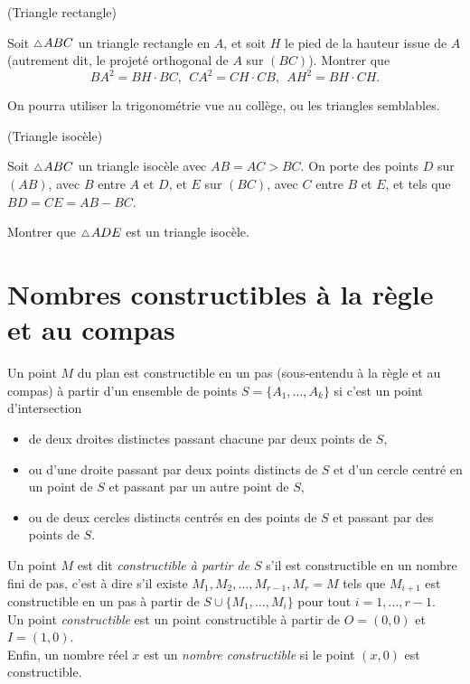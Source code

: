\documentclass[a4paper,11pt,reqno]{amsart}
\begin{document}
\begin{exo} (Triangle rectangle)

  Soit $\tri ABC$ un triangle rectangle en $A$, et soit $H$ le pied de la hauteur issue de $A$ (autrement dit, le projeté orthogonal de $A$ sur $(BC)$).  Montrer que
  \[
    BA^2=BH \cdot BC,\ \ CA^2=CH \cdot CB,\ \ AH^2=BH \cdot CH.
  \]
  \begin{indication}
    On pourra utiliser la trigonométrie vue au collège, ou les triangles semblables.
  \end{indication}
\end{exo}


\begin{exo} (Triangle isocèle)

  Soit $\tri ABC$ un triangle isocèle avec $AB=AC > BC$. On porte des points $D$ sur $(AB)$, avec $B$ entre $A$ et $D$, et $E$ sur $(BC)$, avec $C$ entre $B$ et $E$, et tels que $BD=CE=AB-BC$.

  Montrer que $\tri ADE$ est un triangle isocèle.
\end{exo}


\section{Nombres constructibles à la règle et au compas}


\begin{convention}\small
  Un point $M$ du plan est constructible en un pas (sous-entendu à la règle et au compas) à partir d'un ensemble de points $S=\{A_1,\ldots,A_k\}$ si c'est un point d'intersection
  \begin{itemize}
    \item de deux droites distinctes passant chacune par deux points de $S$,
    \item ou d'une droite passant par deux points distincts de $S$ et d'un cercle centré en un point de $S$ et passant par un autre point de $S$,
    \item ou de deux cercles distincts centrés en des points de $S$ et passant par des points de $S$.
  \end{itemize}

  Un point $M$ est dit \emph{constructible à partir de $S$} s'il est constructible en un nombre fini de pas, c'est à dire s'il existe $M_1,M_2,\ldots,M_{r-1},M_r=M$ tels que $M_{i+1}$ est constructible en un pas à partir de $S \cup \{M_1,\ldots,M_{i}\}$ pour tout $i=1,\ldots,r-1$.\\
  Un point \emph{constructible} est un point constructible à partir de $O=(0,0)$ et $I=(1,0)$.\\
  Enfin, un nombre réel $x$ est un \emph{nombre constructible} si le point $(x,0)$ est constructible.
\end{convention}
\end{document}
